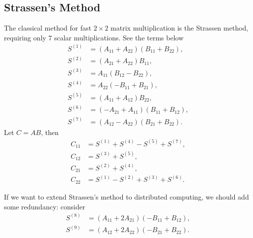 \subsection{Strassen's Method}
The classical method for fast $2\times2$ matrix multiplication is the Strassen method, requiring only $7$ scalar multiplications. See the terms below
\begin{align*}
    S^{(1)} &= (A_{11} + A_{22}) (B_{11} + B_{22}), \\
    S^{(2)} &= (A_{21} + A_{22}) B_{11}, \\
    S^{(3)} &= A_{11} (B_{12} - B_{22}), \\
    S^{(4)} &= A_{22} (-B_{11} + B_{21}), \\
    S^{(5)} &= (A_{11} + A_{12}) B_{22}, \\
    S^{(6)} &= (-A_{21} + A_{11}) (B_{11} + B_{12}), \\
    S^{(7)} &= (A_{12} - A_{22}) (B_{21} + B_{22}).
\end{align*}
Let $C=AB$, then
\begin{align*}
    C_{11} &= S^{(1)} + S^{(4)} - S^{(5)} + S^{(7)}, \\
    C_{12} &= S^{(3)} + S^{(5)}, \\
    C_{21} &= S^{(2)} + S^{(4)}, \\
    C_{22} &= S^{(1)} - S^{(2)} + S^{(3)} + S^{(6)}.
\end{align*}

If we want to extend Strassen's method to distributed computing, we should add some redundancy: consider
\begin{align*}
    S^{(8)} &= (A_{11} + 2 A_{21}) (-B_{11} + B_{12}), \\
    S^{(9)} &= (A_{12} + 2 A_{22}) (-B_{21} + B_{22}).
\end{align*}

